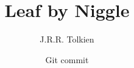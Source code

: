 \documentclass{scrartcl}
\begin{document}
\title{Leaf by Niggle}
\author{J.R.R. Tolkien}
\date{Git commit \gitFirstTagDescribe}
\maketitle


\end{document}
